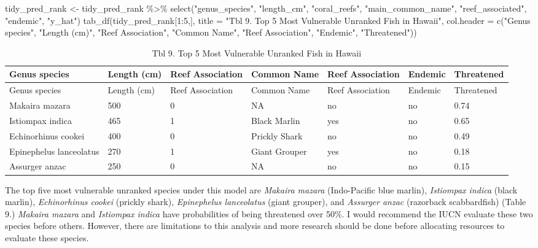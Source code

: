 \documentclass[
  letterpaper,
  DIV=11,
  numbers=noendperiod]{scrartcl}
\newenvironment{Shaded}{\begin{snugshade}}{\end{snugshade}}
\newcommand{\AttributeTok}[1]{\textcolor[rgb]{0.40,0.45,0.13}{#1}}
\newcommand{\DecValTok}[1]{\textcolor[rgb]{0.68,0.00,0.00}{#1}}
\newcommand{\FunctionTok}[1]{\textcolor[rgb]{0.28,0.35,0.67}{#1}}
\newcommand{\NormalTok}[1]{\textcolor[rgb]{0.00,0.23,0.31}{#1}}
\newcommand{\OtherTok}[1]{\textcolor[rgb]{0.00,0.23,0.31}{#1}}
\newcommand{\SpecialCharTok}[1]{\textcolor[rgb]{0.37,0.37,0.37}{#1}}
\newcommand{\StringTok}[1]{\textcolor[rgb]{0.13,0.47,0.30}{#1}}
\begin{document}
\begin{Shaded}
\begin{Highlighting}[]
\NormalTok{tidy\_pred\_rank }\OtherTok{\textless{}{-}}\NormalTok{ tidy\_pred\_rank }\SpecialCharTok{\%\textgreater{}\%} 
  \FunctionTok{select}\NormalTok{(}\StringTok{"genus\_species"}\NormalTok{, }\StringTok{"length\_cm"}\NormalTok{, }\StringTok{"coral\_reefs"}\NormalTok{, }\StringTok{"main\_common\_name"}\NormalTok{, }\StringTok{"reef\_associated"}\NormalTok{, }\StringTok{"endemic"}\NormalTok{, }\StringTok{"y\_hat"}\NormalTok{)}
\FunctionTok{tab\_df}\NormalTok{(tidy\_pred\_rank[}\DecValTok{1}\SpecialCharTok{:}\DecValTok{5}\NormalTok{,],}
       \AttributeTok{title =} \StringTok{"Tbl 9. Top 5 Most Vulnerable Unranked Fish in Hawaii"}\NormalTok{,}
       \AttributeTok{col.header =} \FunctionTok{c}\NormalTok{(}\StringTok{"Genus species"}\NormalTok{, }\StringTok{"Length (cm)"}\NormalTok{, }\StringTok{"Reef Association"}\NormalTok{,}
                          \StringTok{"Common Name"}\NormalTok{, }\StringTok{"Reef Association"}\NormalTok{, }\StringTok{"Endemic"}\NormalTok{,}
                          \StringTok{"Threatened"}\NormalTok{))}
\end{Highlighting}
\end{Shaded}

\begin{longtable}[]{@{}lllllll@{}}
\caption{Tbl 9. Top 5 Most Vulnerable Unranked Fish in
Hawaii}\tabularnewline
\toprule()
Genus species & Length (cm) & Reef Association & Common Name & Reef
Association & Endemic & Threatened \\
\midrule()
\endfirsthead
\toprule()
Genus species & Length (cm) & Reef Association & Common Name & Reef
Association & Endemic & Threatened \\
\midrule()
\endhead
Makaira mazara & 500 & 0 & NA & no & no & 0.74 \\
Istiompax indica & 465 & 1 & Black Marlin & yes & no & 0.65 \\
Echinorhinus cookei & 400 & 0 & Prickly Shark & no & no & 0.49 \\
Epinephelus lanceolatus & 270 & 1 & Giant Grouper & yes & no & 0.18 \\
Assurger anzac & 250 & 0 & NA & no & no & 0.15 \\
\bottomrule()
\end{longtable}

The top five most vulnerable unranked species under this model are
\emph{Makaira mazara} (Indo-Pacific blue marlin), \emph{Istiompax
indica} (black marlin), \emph{Echinorhinus cookei} (prickly shark),
\emph{Epinephelus lanceolatus} (giant grouper), and \emph{Assurger
anzac} (razorback scabbardfish) (Table 9.) \emph{Makaira mazara} and
\emph{Istiompax indica} have probabilities of being threatened over
50\%. I would recommend the IUCN evaluate these two species before
others. However, there are limitations to this analysis and more
research should be done before allocating resources to evaluate these
species.
\end{document}
